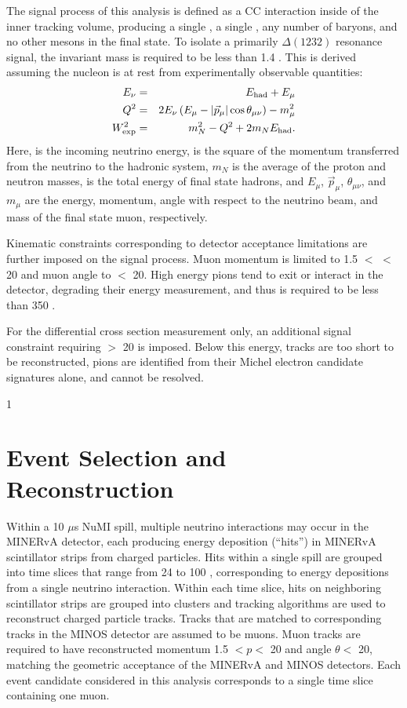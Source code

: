 \documentclass[aps,prl,twocolumn,showpacs,superscriptaddress,letterpaper,showkeys,superscriptaddress,floatfix,nofootinbib]{revtex4-1}
\newcommand{\showSections}[0]{0}
\begin{document}
The signal process of this analysis is defined as a \numu CC interaction inside of the inner tracking volume, producing a single \muminus, a single \pip, any number of baryons, and no other mesons in the final state. To isolate a primarily $\Delta(1232)$ resonance signal, the invariant mass \Wexp is required to be less than 1.4 \GeVcsq.  This is derived assuming the nucleon is at rest from experimentally observable quantities:
\begin{eqnarray}
E_{\nu} &=& E_{\mathrm{had}} + E_{\mu}
    \label{eq:nu}\\
    Q^2 &=& 2E_\nu\left(E_\mu - \left|\vec{p}_\mu\right|\cos\theta_{\mu\nu}\right) - m_\mu^2 \label{eq:q2} \\
    W_{\mathrm{exp}}^2 &=& m_N^2 - Q^{2} + 2m_NE_{\mathrm{had}} \label{eq:wexp}.
\end{eqnarray}
Here, \Enu is the incoming neutrino energy, \Qsq is the square of the momentum transferred from the neutrino to the hadronic system, $m_N$ is the average of the proton and neutron masses, \Ehad is the total energy of final state hadrons, and $E_\mu$, $\vec{p}_\mu$, $\theta_{\mu\nu}$, and $m_\mu$ are the energy, momentum, angle with respect to the neutrino beam, and mass of the final state muon, respectively.

Kinematic constraints corresponding to detector acceptance limitations are further imposed on the signal process. Muon momentum is limited to 1.5 $<$ \pmu $<$ 20 \GeVc and muon angle to \thmu $<$ 20\degs. High energy pions tend to exit or interact in the detector, degrading their energy measurement, and thus \Tpi is required to be less than 350 \MeV.

For the \thpi differential cross section measurement only, an additional signal constraint requiring \Tpi $>$ 20 \MeV is imposed. Below this energy, tracks are too short to be reconstructed, pions are identified from their Michel electron candidate signatures alone, and \thpi cannot be resolved.

\if\showSections1 \section{Event Selection and Reconstruction} \fi

Within a 10 $\mu$s NuMI spill, multiple neutrino interactions may occur in the MINERvA detector, each producing energy deposition (``hits'') in MINERvA scintillator strips from charged particles. Hits within a single spill are grouped into time slices that range from 24 \ns to 100 \ns, corresponding to energy depositions from a single neutrino interaction. Within each time slice, hits on neighboring scintillator strips are grouped into clusters and tracking algorithms are used to reconstruct charged particle tracks. Tracks that are matched to corresponding tracks in the MINOS detector are assumed to be muons.  Muon tracks are required to have reconstructed momentum 1.5 $ < p <$ 20 \GeVc and angle $\theta <$ 20\degs, matching the geometric acceptance of the MINERvA and MINOS detectors. Each event candidate considered in this analysis corresponds to a single time slice containing one muon.
\end{document}
